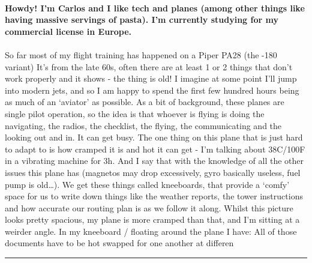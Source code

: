 \documentclass[10pt,a4paper]{article}
\begin{document}
\begin{multicols*}{2}
\paragraph{}
\textbf{Howdy! I’m Carlos and I like tech and planes (among other things like having massive servings of pasta). I’m currently studying for my commercial license in Europe.}
\paragraph{}
 So far most of my flight training has happened on a Piper PA28 (the -180 variant)
It’s from the late 60s, often there are at least 1 or 2 things that don’t work properly and it shows - the thing is old! I imagine at some point I’ll jump into modern jets, and so I am happy to spend the first few hundred hours being as much of an ‘aviator’ as possible.
As a bit of background, these planes are single pilot operation, so the idea is that whoever is flying is doing the navigating, the radios, the checklist, the flying, the communicating and the looking out and in. It can get busy.
The one thing on this plane that is just hard to adapt to is how cramped it is and hot it can get - I’m talking about 38C/100F in a vibrating machine for 3h. And I say that with the knowledge of all the other issues this plane has (magnetos may drop excessively, gyro basically useless, fuel pump is old…).
We get these things called kneeboards, that provide a ‘comfy’ space for us to write down things like the weather reports, the tower instructions and how accurate our routing plan is as we follow it along.
Whilst this picture looks pretty spacious, my plane is more cramped than that, and I’m sitting at a weirder angle. In my kneeboard / floating around the plane I have:
All of those documents have to be hot swapped for one another at differen
\par\noindent\textcolor{red}{\rule{\linewidth}{0.2mm}}
\vfill
\null
\noindent\begin{minipage}{\linewidth}

\end{minipage}
\end{multicols*}
\end{document}

